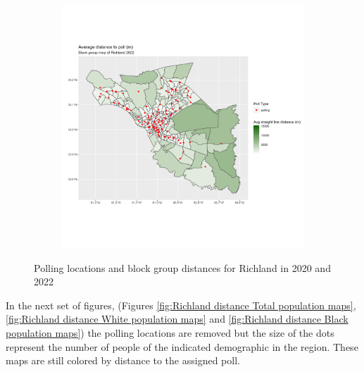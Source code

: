 \documentclass[11pt]{article}
\theoremstyle{remark}
\theoremstyle{definition}
\begin{document}
\begin{figure}
\begin{subfigure}{.5\textwidth}
		\includegraphics[width=\linewidth]{result_analysis/Richland_SC_original_configs/distance_map_Richland_config_original_2022_polls.png}
		\label{sfig:Richland_2022_bg_dist}
	\end{subfigure}
	\caption{Polling locations and block group distances for Richland in 2020 and 2022}
	\label{fig:Richland distance maps}
\end{figure}

In the next set of figures, (Figures \ref{fig:Richland distance Total population maps}, \ref{fig:Richland distance White population maps} and \ref{fig:Richland distance Black population maps}) the polling locations are removed but the size of the dots represent the number of people of the indicated demographic in the region. These maps are still colored by distance to the assigned poll.
\end{document}
